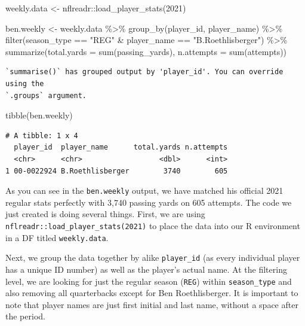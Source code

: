 \documentclass[
  letterpaper,
]{krantz}
\newenvironment{Shaded}{\begin{snugshade}}{\end{snugshade}}
\newcommand{\AttributeTok}[1]{\textcolor[rgb]{0.40,0.45,0.13}{#1}}
\newcommand{\DecValTok}[1]{\textcolor[rgb]{0.68,0.00,0.00}{#1}}
\newcommand{\FunctionTok}[1]{\textcolor[rgb]{0.28,0.35,0.67}{#1}}
\newcommand{\NormalTok}[1]{\textcolor[rgb]{0.00,0.23,0.31}{#1}}
\newcommand{\OtherTok}[1]{\textcolor[rgb]{0.00,0.23,0.31}{#1}}
\newcommand{\SpecialCharTok}[1]{\textcolor[rgb]{0.37,0.37,0.37}{#1}}
\newcommand{\StringTok}[1]{\textcolor[rgb]{0.13,0.47,0.30}{#1}}
\begin{document}
\begin{Shaded}
\begin{Highlighting}[]
\NormalTok{weekly.data }\OtherTok{\textless{}{-}}\NormalTok{ nflreadr}\SpecialCharTok{::}\FunctionTok{load\_player\_stats}\NormalTok{(}\DecValTok{2021}\NormalTok{)}

\NormalTok{ben.weekly }\OtherTok{\textless{}{-}}\NormalTok{ weekly.data }\SpecialCharTok{\%\textgreater{}\%}
  \FunctionTok{group\_by}\NormalTok{(player\_id, player\_name) }\SpecialCharTok{\%\textgreater{}\%}
  \FunctionTok{filter}\NormalTok{(season\_type }\SpecialCharTok{==} \StringTok{"REG"} \SpecialCharTok{\&}\NormalTok{ player\_name }\SpecialCharTok{==} \StringTok{"B.Roethlisberger"}\NormalTok{) }\SpecialCharTok{\%\textgreater{}\%}
  \FunctionTok{summarize}\NormalTok{(}\AttributeTok{total.yards =} \FunctionTok{sum}\NormalTok{(passing\_yards),}
            \AttributeTok{n.attempts =} \FunctionTok{sum}\NormalTok{(attempts))}
\end{Highlighting}
\end{Shaded}

\begin{verbatim}
`summarise()` has grouped output by 'player_id'. You can override using the
`.groups` argument.
\end{verbatim}

\begin{Shaded}
\begin{Highlighting}[]
\FunctionTok{tibble}\NormalTok{(ben.weekly)}
\end{Highlighting}
\end{Shaded}

\begin{verbatim}
# A tibble: 1 x 4
  player_id  player_name      total.yards n.attempts
  <chr>      <chr>                  <dbl>      <int>
1 00-0022924 B.Roethlisberger        3740        605
\end{verbatim}

As you can see in the \texttt{ben.weekly} output, we have matched his
official 2021 regular stats perfectly with 3,740 passing yards on 605
attempts. The code we just created is doing several things. First, we
are using \texttt{nflreadr::load\_player\_stats(2021)} to place the data
into our R environment in a DF titled \texttt{weekly.data}.

Next, we group the data together by alike \texttt{player\_id} (as every
individual player has a unique ID number) as well as the player's actual
name. At the filtering level, we are looking for just the regular season
(\texttt{REG}) within \texttt{season\_type} and also removing all
quarterbacks except for Ben Roethlisberger. It is important to note that
player names are just first initial and last name, without a space after
the period.
\end{document}
